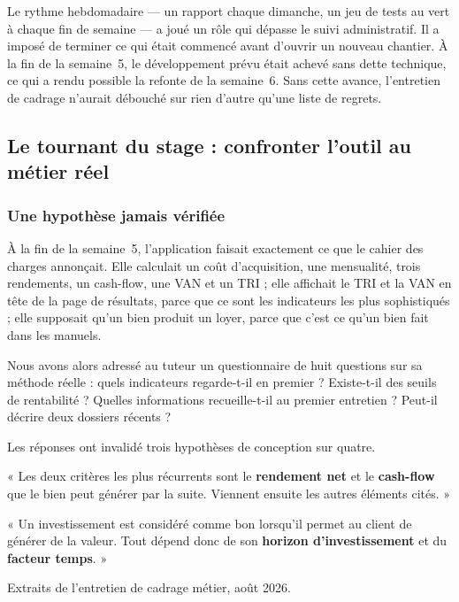 \documentclass[12pt,a4paper]{article}
\begin{document}
Le rythme hebdomadaire --- un rapport chaque dimanche, un jeu de tests au vert à
chaque fin de semaine --- a joué un rôle qui dépasse le suivi administratif. Il
a imposé de terminer ce qui était commencé avant d'ouvrir un nouveau chantier.
À la fin de la semaine~5, le développement prévu était achevé sans dette
technique, ce qui a rendu possible la refonte de la semaine~6. Sans cette
avance, l'entretien de cadrage n'aurait débouché sur rien d'autre qu'une liste
de regrets.

\subsection{Le tournant du stage : confronter l'outil au métier réel}

\subsubsection{Une hypothèse jamais vérifiée}

À la fin de la semaine~5, l'application faisait exactement ce que le cahier des
charges annonçait. Elle calculait un coût d'acquisition, une mensualité, trois
rendements, un cash-flow, une VAN et un TRI ; elle affichait le TRI et la VAN en
tête de la page de résultats, parce que ce sont les indicateurs les plus
sophistiqués ; elle supposait qu'un bien produit un loyer, parce que c'est ce
qu'un bien fait dans les manuels.

Nous avons alors adressé au tuteur un questionnaire de huit questions sur sa
méthode réelle : quels indicateurs regarde-t-il en premier ? Existe-t-il des
seuils de rentabilité ? Quelles informations recueille-t-il au premier
entretien ? Peut-il décrire deux dossiers récents ?

Les réponses ont invalidé trois hypothèses de conception sur quatre.

\begin{citationbox}
	« Les deux critères les plus récurrents sont le \textbf{rendement net} et le
	\textbf{cash-flow} que le bien peut générer par la suite. Viennent ensuite les
	autres éléments cités. »

	\vspace{0.4em}
	« Un investissement est considéré comme bon lorsqu'il permet au client de
	générer de la valeur. Tout dépend donc de son \textbf{horizon
		d'investissement} et du \textbf{facteur temps}. »

	\vspace{0.4em}
	{\footnotesize\color{smoke} Extraits de l'entretien de cadrage métier,
		août 2026.}
\end{citationbox}
\end{document}
